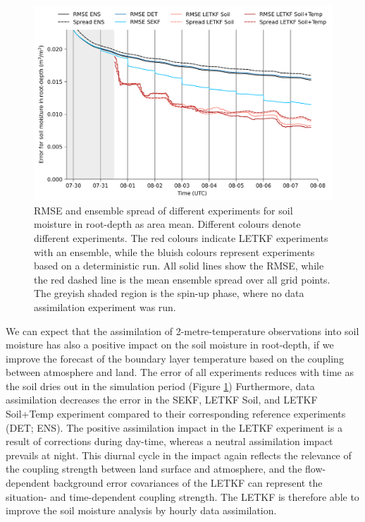 \documentclass[HESSD, manuscript]{copernicus}
\begin{document}
\begin{figure}[ht]
	\includegraphics[width=\textwidth]{figures/fig_05_err_h2o_long.png}
	\caption{
		RMSE and ensemble spread of different experiments for soil moisture in root-depth as area mean.
		Different colours denote different experiments.
		The red colours indicate LETKF experiments with an ensemble, while the bluish colours represent experiments based on a deterministic run.
		All solid lines show the RMSE, while the red dashed line is the mean ensemble spread over all grid points.
		The greyish shaded region is the spin-up phase, where no data assimilation experiment was run.
	}
	\label{fig:err_h2o_long}
\end{figure}

We can expect that the assimilation of 2-metre-temperature observations into soil moisture has also a positive impact on the soil moisture in root-depth, if we improve the forecast of the boundary layer temperature based on the coupling between atmosphere and land.
The error of all experiments reduces with time as the soil dries out in the simulation period (Figure \ref{fig:err_h2o_long})
Furthermore, data assimilation decreases the error in the SEKF, LETKF Soil, and LETKF Soil+Temp experiment compared to their corresponding reference experiments (DET; ENS).
The positive assimilation impact in the LETKF experiment is a result of corrections during day-time, whereas a neutral assimilation impact prevails at night.
This diurnal cycle in the impact again reflects the relevance of the coupling strength between land surface and atmosphere, and the flow-dependent background error covariances of the LETKF can represent the situation- and time-dependent coupling strength.
The LETKF is therefore able to improve the soil moisture analysis by hourly data assimilation.
\end{document}
